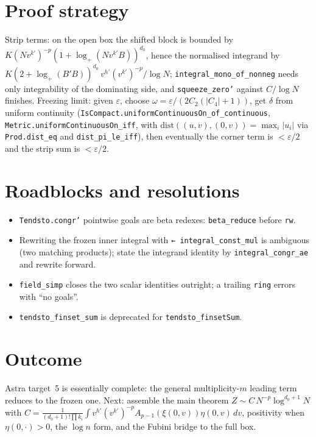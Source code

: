 \documentclass[11pt]{article}
\begin{document}
\section{Proof strategy}
Strip terms: on the open box the shifted block is bounded by
$K(Nv^{k'})^{-p}(1+\log_+(Nv^{k'}B))^{d_0}$, hence the normalised integrand by
$K(2+\log_+(B'B))^{d_0}\,v^{h'}(v^{k'})^{-p}/\log N$; \texttt{integral\_mono\_of\_nonneg} needs only
integrability of the dominating side, and \texttt{squeeze\_zero'} against $C/\log N$ finishes.
Freezing limit: given $\varepsilon$, choose $\omega=\varepsilon/(2C_2(|C_4|+1))$, get $\delta$ from
uniform continuity (\texttt{IsCompact.uniformContinuousOn\_of\_continuous},
\texttt{Metric.uniformContinuousOn\_iff}, with $\mathrm{dist}((u,v),(0,v))=\max_i|u_i|$ via
\texttt{Prod.dist\_eq} and \texttt{dist\_pi\_le\_iff}), then eventually the corner term is
$<\varepsilon/2$ and the strip sum is $<\varepsilon/2$.

\section{Roadblocks and resolutions}
\begin{itemize}
\item \texttt{Tendsto.congr'} pointwise goals are beta redexes: \texttt{beta\_reduce} before
\texttt{rw}.
\item Rewriting the frozen inner integral with \texttt{← integral\_const\_mul} is ambiguous (two
matching products); state the integrand identity by \texttt{integral\_congr\_ae} and rewrite forward.
\item \texttt{field\_simp} closes the two scalar identities outright; a trailing \texttt{ring} errors
with ``no goals''.
\item \texttt{tendsto\_finset\_sum} is deprecated for \texttt{tendsto\_finsetSum}.
\end{itemize}

\section{Outcome}
Astra target~5 is essentially complete: the general multiplicity-$m$ leading term reduces to the
frozen one. Next: assemble the main theorem $Z\sim C\,N^{-p}\log^{d_0+1}N$ with
$C=\frac{1}{(d_0+1)!\prod k_i}\int v^{h'}(v^{k'})^{-p}A_{p-1}(\xi(0,v))\eta(0,v)\,dv$, positivity when
$\eta(0,\cdot)>0$, the $\log n$ form, and the Fubini bridge to the full box.
\end{document}

